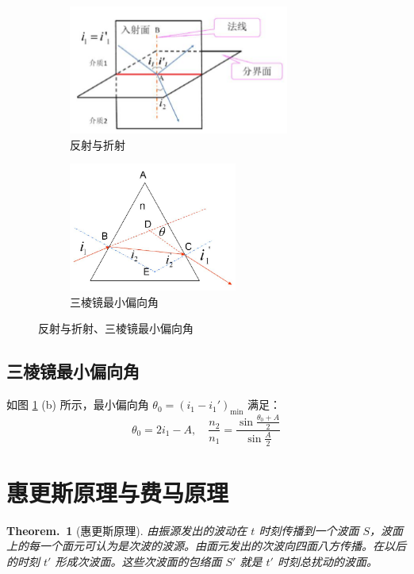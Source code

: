 \documentclass[UTF8]{report}
\theoremstyle{MyLineTheoremStyle} %
\newtheorem{LineTheorem}{Theorem.\,}
\theoremstyle{MyBlockTheoremStyle} %
\theoremstyle{MySubsubsectionStyle} %
\begin{document}
\begin{figure}[H]\centering
\begin{subfigure}[t]{0.5\columnwidth}\centering
    \includegraphics[height=120pt]{assets/1,2/image (44).jpg}
    \caption{ 反射与折射 }
\end{subfigure}\hfill
\begin{subfigure}[t]{0.5\columnwidth}\centering
    \includegraphics[height=120pt]{assets/1,2/image (45).jpg}
    \caption{ 三棱镜最小偏向角 }
\end{subfigure}
\caption{ 反射与折射、三棱镜最小偏向角 }\label{反射与折射、三棱镜最小偏向角}
\end{figure}


\subsection{三棱镜最小偏向角}

如图 \ref{反射与折射、三棱镜最小偏向角} (b) 所示，最小偏向角 $\theta_0 = (i_1 - i_1')_{\text{min}}$ 满足：
\begin{equation}
    \theta_0 = 2i_1 - A, \quad \frac{n_2}{n_1} = \frac{\sin\frac{\theta_0+A}2}{\sin\frac A2}
\end{equation}



\section{惠更斯原理与费马原理}

\begin{LineTheorem}[惠更斯原理]\label{LineTheorem: 惠更斯原理}
    由振源发出的波动在 $t$ 时刻传播到一个波面 $S$，波面上的每一个面元可认为是次波的波源。由面元发出的次波向四面八方传播。在以后的时刻 $t'$ 形成次波面。这些次波面的包络面 $S'$ 就是 $t'$ 时刻总扰动的波面。
\end{LineTheorem}
\end{document}
